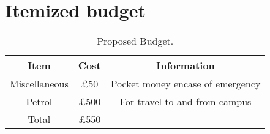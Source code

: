 \documentclass[11pt]{article}
\begin{document}
\def\Task#1#2#3#4{%
\node[task number] at ($(Header.west) + (0, -#1)$) {#1};
\node[task description] at (0,-#1) {#2};
\begin{scope}[shift=($(Header.south east)$)]
  \draw (0,-#1) rectangle +(\totalmonths, 1);
  \foreach \x in {1,...,\totalmonths}
    \draw[help lines] (\x,-#1) -- +(0,1);
  \filldraw[gantt bar] ($(#3, -#1+0.2)$) rectangle +(#4,0.6);
\end{scope}
}

\thispagestyle{empty}


\section{Itemized budget}
\begin{table}[h!]
\begin{center}
\begin{tabular}{||c c c ||} 
 \hline
 Item & Cost & Information \\ [0.5ex] 
 \hline\hline
 Miscellaneous & £50 & Pocket money encase of emergency  \\
 Petrol & £500 & For travel to and from campus\\
 Total & £550 & \\ [1ex] 
 \hline
\end{tabular}
\end{center}
\caption{Proposed Budget.}
\label{table:1}
\end{table}

\printbibliography
\end{document}
